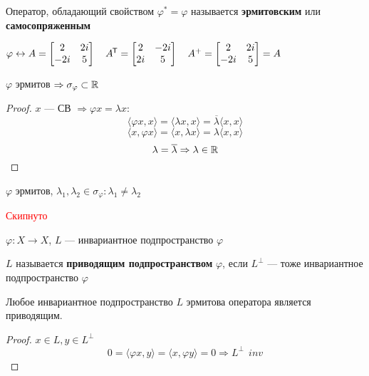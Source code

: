 \begin{definition}
    Оператор, обладающий свойством $\varphi^*=\varphi$ называется \textbf{эрмитовским} или \textbf{самосопряженным}
\end{definition}

\begin{example}
    $\varphi\leftrightarrow A = \begin{bmatrix}
            2   & 2i \\
            -2i & 5
        \end{bmatrix} \quad A^{\mkern-1.5mu\mathsf{T}} = \begin{bmatrix}
            2  & -2i \\
            2i & 5
        \end{bmatrix} \quad A^+ = \begin{bmatrix}
            2   & 2i \\
            -2i & 5
        \end{bmatrix} = A$
\end{example}

\begin{lemma}
    $\varphi$ эрмитов $\Rightarrow \sigma_\varphi\subset\mathbb{R}$
\end{lemma}
\begin{proof}
    $x$ --- СВ $\Rightarrow \varphi x = \lambda x$:
    $$\langle \varphi x, x \rangle = \langle \lambda x, x \rangle = \overline \lambda \langle x, x \rangle$$
    $$\langle x, \varphi x \rangle = \langle x, \lambda x \rangle = \lambda \langle x, x \rangle$$
    $$\lambda = \overline \lambda \Rightarrow \lambda\in\mathbb{R}$$
\end{proof}

\begin{lemma}
    $\varphi$ эрмитов, $\lambda_1, \lambda_2\in\sigma_\varphi : \lambda_1 \not= \lambda_2$

    \textcolor{red}{Скипнуто}
\end{lemma}

\begin{definition}
    $\varphi : X \to X$, $L$ --- инвариантное подпространство $\varphi$

    $L$ называется \textbf{приводящим подпространством} $\varphi$, если $L^\perp$ --- тоже инвариантное подпространство $\varphi$
\end{definition}

\begin{lemma}
    Любое инвариантное подпространство $L$ эрмитова оператора является приводящим.
\end{lemma}
\begin{proof}
    $x\in L, y\in L^\perp$
    $$0 = \langle \varphi x, y \rangle = \langle x, \varphi y \rangle = 0 \Rightarrow L^\perp\ \ inv$$
\end{proof}


